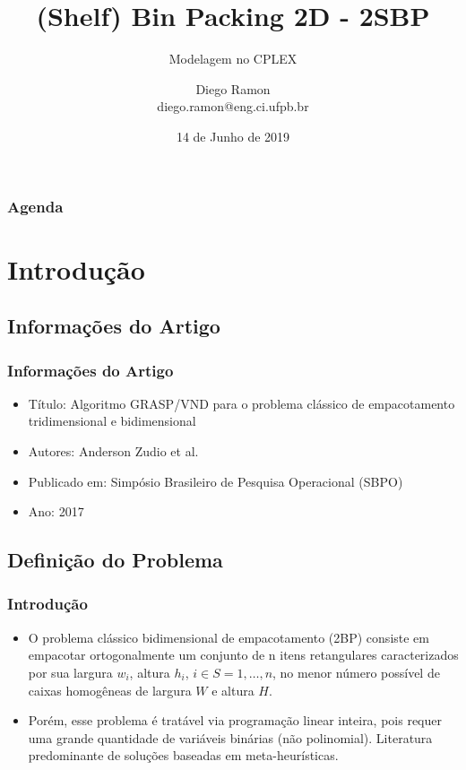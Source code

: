 \documentclass{beamer}
\title[(Shelf) Bin Packing 2D - 2SBP] %
{(Shelf) Bin Packing 2D - 2SBP}
\subtitle{Modelagem no CPLEX}
\author[Diego Ramon] %
{\scriptsize Diego Ramon \\
diego.ramon@eng.ci.ufpb.br}
\institute[UFPB]  %
{\\[1.0mm] 
 Universidade Federal da Paraíba\\
 Pós-Graduação em Informática\\ 
 Pesquisa Operacional
}
\date[PO 2019] %
{\tiny {14 de Junho de 2019}}
\begin{document}
\frame{\titlepage}
\begin{frame}
\frametitle{\textbf{Agenda}}
	\hspace*{+4.0em}
	\footnotesize{ \tableofcontents }
\end{frame}


\section{Introdução}

\subsection{Informações do Artigo}

\begin{frame}
\frametitle {Informações do Artigo}

 \begin{itemize}
    \item Título: Algoritmo GRASP/VND para o problema clássico de empacotamento
tridimensional e bidimensional
    \item Autores: Anderson Zudio et al.
    \item Publicado em: Simpósio Brasileiro de Pesquisa Operacional (SBPO)
    \item Ano: 2017
    
 \end{itemize}

\end{frame}

\subsection{Definição do Problema}

\begin{frame}
\frametitle {Introdução}

    \begin{itemize}
    \item 
        O problema clássico bidimensional de empacotamento (2BP) consiste em empacotar ortogonalmente um conjunto de n itens retangulares caracterizados por sua largura $w_i$, altura $h_i$, $i \in S = {1, \dots, n}$, no menor número possível de caixas homogêneas de largura $W$ e altura $H$.
    \item Porém, esse problema é tratável via programação linear inteira, pois requer uma grande quantidade de variáveis binárias (não polinomial). Literatura predominante de soluções baseadas em meta-heurísticas.
    \end{itemize}
\end{frame}
\end{document}
